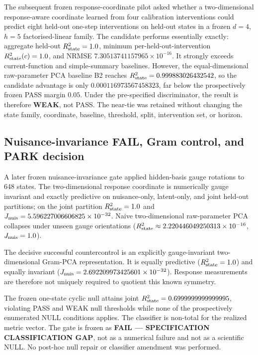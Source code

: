 The subsequent frozen response-coordinate pilot asked whether a two-dimensional response-aware coordinate learned from four calibration interventions could predict eight held-out one-step interventions on held-out states in a frozen $d=4$, $h=5$ factorised-linear family. The candidate performs essentially exactly: aggregate held-out $R^2_{\rm state}=1.0$, minimum per-held-out-intervention $R^2_{\rm state}(c)=1.0$, and NRMSE $7.30513741157965\times10^{-16}$. It strongly exceeds current-function and simple-summary baselines. However, the equal-dimensional raw-parameter PCA baseline B2 reaches $R^2_{\rm state}=0.999883026432542$, so the candidate advantage is only $0.000116973567458323$, far below the prospectively frozen PASS margin $0.05$. Under the pre-specified discriminator, the result is therefore \textbf{WEAK}, not PASS. The near-tie was retained without changing the state family, coordinate, baseline, threshold, split, intervention set, or horizon.

\subsection{Nuisance-invariance FAIL, Gram control, and PARK decision}

A later frozen nuisance-invariance gate applied hidden-basis gauge rotations to 648 states. The two-dimensional response coordinate is numerically gauge invariant and exactly predictive on nuisance-only, latent-only, and joint held-out partitions; on the joint partition $R^2_{\rm state}=1.0$ and $J_{\rm nuis}=5.596227006606825\times10^{-32}$. Naive two-dimensional raw-parameter PCA collapses under unseen gauge orientations ($R^2_{\rm state}\approx2.220446049250313\times10^{-16}$, $J_{\rm nuis}=1.0$).

The decisive successful countercontrol is an explicitly gauge-invariant two-dimensional Gram-PCA representation. It is equally predictive ($R^2_{\rm state}=1.0$) and equally invariant ($J_{\rm nuis}=2.692209973425601\times10^{-32}$). Response measurements are therefore not uniquely required to quotient this known symmetry.

The frozen one-state cyclic null attains joint $R^2_{\rm state}=0.6999999999999995$, violating PASS and WEAK null thresholds while none of the prospectively enumerated NULL conditions applies. The classifier is non-total for the realized metric vector. The gate is frozen as \textbf{FAIL --- SPECIFICATION CLASSIFICATION GAP}, not as a numerical failure and not as a scientific NULL. No post-hoc null repair or classifier amendment was performed.

